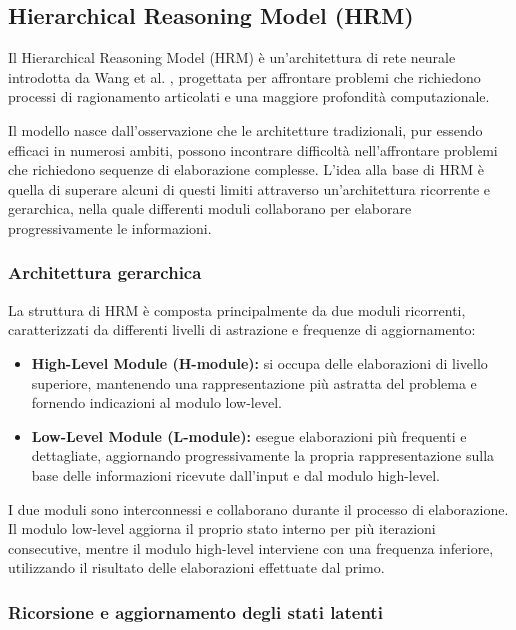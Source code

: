 \subsection{Hierarchical Reasoning Model (HRM)}

Il Hierarchical Reasoning Model (HRM) è un'architettura di rete neurale introdotta da Wang et al. \cite{hrm}, progettata per affrontare problemi che richiedono processi di ragionamento articolati e una maggiore profondità computazionale.

Il modello nasce dall'osservazione che le architetture tradizionali, pur essendo efficaci in numerosi ambiti, possono incontrare difficoltà nell'affrontare problemi che richiedono sequenze di elaborazione complesse. L'idea alla base di HRM è quella di superare alcuni di questi limiti attraverso un'architettura ricorrente e gerarchica, nella quale differenti moduli collaborano per elaborare progressivamente le informazioni.

\subsubsection{Architettura gerarchica}

La struttura di HRM è composta principalmente da due moduli ricorrenti, caratterizzati da differenti livelli di astrazione e frequenze di aggiornamento:

\begin{itemize}
    \item \textbf{High-Level Module (H-module):} si occupa delle elaborazioni di livello superiore, mantenendo una rappresentazione più astratta del problema e fornendo indicazioni al modulo low-level.
    \item \textbf{Low-Level Module (L-module):} esegue elaborazioni più frequenti e dettagliate, aggiornando progressivamente la propria rappresentazione sulla base delle informazioni ricevute dall'input e dal modulo high-level.
\end{itemize}

I due moduli sono interconnessi e collaborano durante il processo di elaborazione. Il modulo low-level aggiorna il proprio stato interno per più iterazioni consecutive, mentre il modulo high-level interviene con una frequenza inferiore, utilizzando il risultato delle elaborazioni effettuate dal primo.

\subsubsection{Ricorsione e aggiornamento degli stati latenti}

